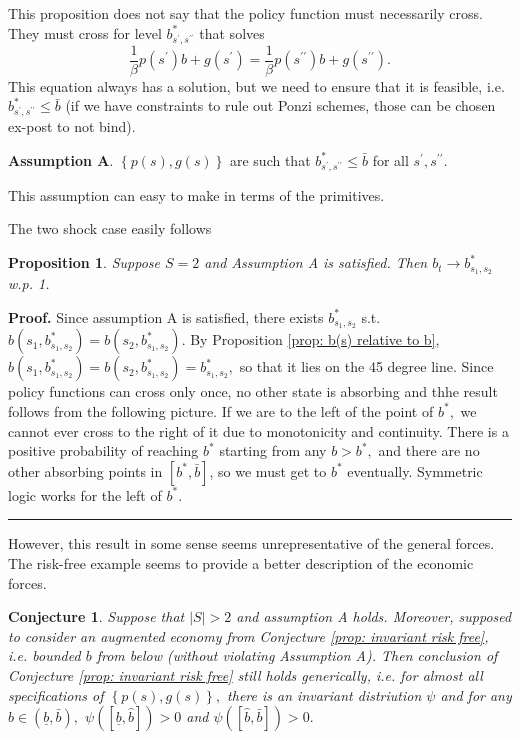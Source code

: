 \documentclass{article}
\newtheorem{conjecture}[theorem]{Conjecture}
\newtheorem{proposition}[theorem]{Proposition}
\newenvironment{proof}[1][Proof]{\noindent\textbf{#1.} }{\ \rule{0.5em}{0.5em}}
\begin{document}
This proposition does not say that the policy function must necessarily
cross. They must cross for level $b_{s^{\prime },s^{\prime \prime }}^{\ast }$
that solves%
\[
\frac{1}{\beta }p\left( s^{\prime }\right) b+g\left( s^{\prime }\right) =%
\frac{1}{\beta }p\left( s^{\prime \prime }\right) b+g\left( s^{\prime \prime
}\right) . 
\]%
This equation always has a solution, but we need to ensure that it is
feasible, i.e. $b_{s^{\prime },s^{\prime \prime }}^{\ast }\leq \bar{b}$ (if
we have constraints to rule out Ponzi schemes, those can be chosen ex-post
to not bind).

\textbf{Assumption A}. $\left\{ p\left( s\right) ,g\left( s\right) \right\} $
are such that $b_{s^{\prime },s^{\prime \prime }}^{\ast }\leq \bar{b}$ for
all $s^{\prime },s^{\prime \prime }.$

\smallskip This assumption can easy to make in terms of the primitives.

The two shock case easily follows

\begin{proposition}
Suppose $S=2$ and Assumption A is satisfied. Then $b_{t}\rightarrow
b_{s_{1},s_{2}}^{\ast }$ w.p. 1.
\end{proposition}

\begin{proof}
\smallskip Since assumption A is satisfied, there exists $%
b_{s_{1},s_{2}}^{\ast }$ s.t. $b\left( s_{1},b_{s_{1},s_{2}}^{\ast }\right)
=b\left( s_{2},b_{s_{1},s_{2}}^{\ast }\right) .$ By Proposition \ref{prop:
b(s) relative to b}, $b\left( s_{1},b_{s_{1},s_{2}}^{\ast }\right) =b\left(
s_{2},b_{s_{1},s_{2}}^{\ast }\right) =b_{s_{1},s_{2}}^{\ast },$ so that it
lies on the 45 degree line. Since policy functions can cross only once, no
other state is absorbing and thhe result follows from the following picture.
If we are to the left of the point of $b^{\ast },$ we cannot ever cross to
the right of it due to monotonicity and continuity. There is a positive
probability of reaching $b^{\ast }$ starting from any $b>b^{\ast },$ and
there are no other absorbing points in $\left[ b^{\ast },\bar{b}\right] $,
so we must get to $b^{\ast }$ eventually. Symmetric logic works for the left
of $b^{\ast }.$
\end{proof}

\smallskip

However, this result in some sense seems unrepresentative of the general
forces. The risk-free example seems to provide a better description of the
economic forces.

\begin{conjecture}
Suppose that $|S|>2$ and assumption A holds. Moreover, supposed to consider
an augmented economy from Conjecture \ref{prop: invariant risk free}, i.e.
bounded $b$ from below (without violating Assumption A). Then conclusion of
Conjecture \ref{prop: invariant risk free} still holds generically, i.e. for
almost all specifications of $\left\{ p\left( s\right) ,g\left( s\right)
\right\} ,$ there is an invariant distriution $\psi $ and for any $\hat{b}%
\in \left( \underline{b},\bar{b}\right) ,$ $\psi \left( \left[ \underline{b},%
\hat{b}\right] \right) >0$ and $\psi \left( \left[ \hat{b},\bar{b}\right]
\right) >0.$
\end{conjecture}
\end{document}
